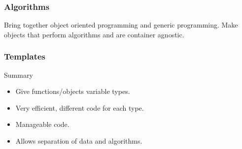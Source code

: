 \begin{frame}[fragile]
  \frametitle{Algorithms}
  Bring together object oriented programming and generic programming.
  Make objects that perform algorithms and are container agnostic.
\end{frame}

\begin{frame}[fragile]
  \frametitle{Templates}
  \begin{block}{Summary}
    \begin{itemize}
    \item Give functions/objects variable types.
    \item Very efficient, different code for each type.
    \item Manageable code.
    \item Allows separation of data and algorithms.
    \end{itemize}
  \end{block}
\end{frame}
